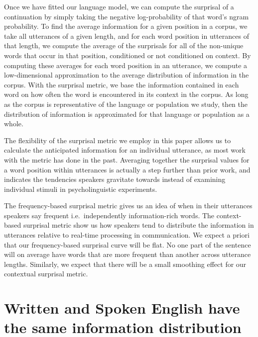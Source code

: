\documentclass[man,floatsintext]{apa6}
\begin{document}
Once we have fitted our language model, we can compute the surprisal of a continuation by simply taking the negative log-probability of that word's ngram probability. To find the average information for a given position in a corpus, we take all utterances of a given length, and for each word position in utterances of that length, we compute the average of the surprisals for all of the non-unique words that occur in that position, conditioned or not conditioned on context. By computing these averages for each word position in an utterance, we compute a low-dimensional approximation to the average distribution of information in the corpus. With the surprisal metric, we base the information contained in each word on how often the word is encountered in its context in the corpus. As long as the corpus is representative of the language or population we study, then the distribution of information is approximated for that language or population as a whole.

The flexibility of the surprisal metric we employ in this paper allows us to calculate the anticipated information for an individual utterance, as most work with the metric has done in the past. Averaging together the surprisal values for a word position within utterances is actually a step further than prior work, and indicates the tendencies speakers gravitate towards instead of examining individual stimuli in psycholinguistic experiments.

The frequency-based surprisal metric gives us an idea of when in their utterances speakers say frequent i.e.~independently information-rich words. The context-based surprisal metric show us how speakers tend to distribute the information in utterances relative to real-time processing in communication. We expect a priori that our frequency-based surprisal curve will be flat. No one part of the sentence will on average have words that are more frequent than another across utterance lengths. Similarly, we expect that there will be a small smoothing effect for our contextual surprisal metric.

\hypertarget{written-and-spoken-english-have-the-same-information-distribution}{%
\section{Written and Spoken English have the same information distribution}\label{written-and-spoken-english-have-the-same-information-distribution}}
\end{document}
